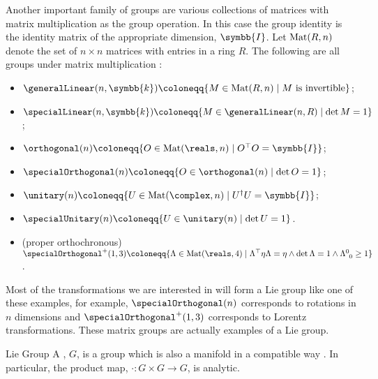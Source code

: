 \documentclass[fleqn]{NotesClass}
\newcommand{\identityMatrix}{\symbb{I}}
\DeclareMathOperator{\Mat}{Mat}
\renewcommand{\field}{\symbb{k}}
\newcommand{\trans}{\top}
\newcommand{\hermit}{\dagger}
\newcommand{\minkowskiMetric}{\eta}
\begin{document}
    Another important family of groups are various collections of matrices with matrix multiplication as the group operation.
    In this case the group identity is the identity matrix of  the appropriate dimension, \(\identityMatrix\).
    Let \(\matrices{n}{R}\) denote the set of \(n \times n\) matrices with entries in a ring \(R\).
    The following are all groups under matrix multiplication \cite{allanach}:
    \begin{itemize}
        \item {} \(\generalLinear(n, \field) \coloneqq \{M \in \matrices{n}{R} \mid M \text{ is invertible} \}\);
        \item {} \(\specialLinear(n, \field) \coloneqq \{M \in \generalLinear(n, R) \mid \det M = 1\}\);
        \item {} \(\orthogonal(n) \coloneqq \{O \in \matrices{n}{\reals} \mid O^\trans O = \identityMatrix \}\);
        \item {} \(\specialOrthogonal(n) \coloneqq \{O \in \orthogonal(n) \mid \det O = 1\}\);
        \item {} \(\unitary(n) \coloneqq \{U \in \matrices{n}{\complex} \mid U^\hermit U = \identityMatrix \}\);
        \item {} \(\specialUnitary(n) \coloneqq \{U \in \unitary(n) \mid \det U = 1\}\).
        \item (proper orthochronous)  \(\specialOrthogonal^+(1, 3) \coloneqq \{\Lambda \in \Mat(\reals, 4) \mid \Lambda^{\trans}\minkowskiMetric \Lambda = \minkowskiMetric \land \det \Lambda = 1 \land \tensor{\Lambda}{^0_0} \ge 1\}\).
    \end{itemize}
    Most of the transformations we are interested in will form a Lie group like one of these examples, for example, \(\specialOrthogonal(n)\) corresponds to rotations in \(n\) dimensions and \(\specialOrthogonal^+(1, 3)\) corresponds to Lorentz transformations.
    These matrix groups are actually examples of a Lie group.
    
    \begin{dfn}{Lie Group}{}
        A , \(G\), is a group which is also a manifold in a compatible way \cite{san-martin-lie-groups}.
        In particular, the product map, \(\cdot \colon G \times G \to G\), is analytic.
    \end{dfn}
    
\end{document}
